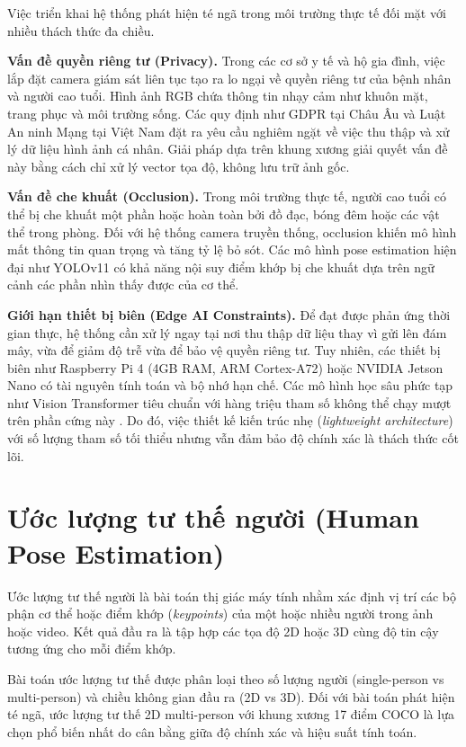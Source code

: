 Việc triển khai hệ thống phát hiện té ngã trong môi trường thực tế đối mặt với nhiều thách thức đa chiều.

\textbf{Vấn đề quyền riêng tư (Privacy).} Trong các cơ sở y tế và hộ gia đình, việc lắp đặt camera giám sát liên tục tạo ra lo ngại về quyền riêng tư của bệnh nhân và người cao tuổi. Hình ảnh RGB chứa thông tin nhạy cảm như khuôn mặt, trang phục và môi trường sống. Các quy định như GDPR tại Châu Âu và Luật An ninh Mạng tại Việt Nam đặt ra yêu cầu nghiêm ngặt về việc thu thập và xử lý dữ liệu hình ảnh cá nhân. Giải pháp dựa trên khung xương giải quyết vấn đề này bằng cách chỉ xử lý vector tọa độ, không lưu trữ ảnh gốc.

\textbf{Vấn đề che khuất (Occlusion).} Trong môi trường thực tế, người cao tuổi có thể bị che khuất một phần hoặc hoàn toàn bởi đồ đạc, bóng đêm hoặc các vật thể trong phòng. Đối với hệ thống camera truyền thống, occlusion khiến mô hình mất thông tin quan trọng và tăng tỷ lệ bỏ sót. Các mô hình pose estimation hiện đại như YOLOv11 có khả năng nội suy điểm khớp bị che khuất dựa trên ngữ cảnh các phần nhìn thấy được của cơ thể.

\textbf{Giới hạn thiết bị biên (Edge AI Constraints).} Để đạt được phản ứng thời gian thực, hệ thống cần xử lý ngay tại nơi thu thập dữ liệu thay vì gửi lên đám mây, vừa để giảm độ trễ vừa để bảo vệ quyền riêng tư. Tuy nhiên, các thiết bị biên như Raspberry Pi 4 (4GB RAM, ARM Cortex-A72) hoặc NVIDIA Jetson Nano có tài nguyên tính toán và bộ nhớ hạn chế. Các mô hình học sâu phức tạp như Vision Transformer tiêu chuẩn với hàng triệu tham số không thể chạy mượt trên phần cứng này \cite{kurniadi2026human}. Do đó, việc thiết kế kiến trúc nhẹ (\textit{lightweight architecture}) với số lượng tham số tối thiểu nhưng vẫn đảm bảo độ chính xác là thách thức cốt lõi.


\section{Ước lượng tư thế người (Human Pose Estimation)}
\label{sec:pose_estimation}

Ước lượng tư thế người là bài toán thị giác máy tính nhằm xác định vị trí các bộ phận cơ thể hoặc điểm khớp (\textit{keypoints}) của một hoặc nhiều người trong ảnh hoặc video. Kết quả đầu ra là tập hợp các tọa độ 2D hoặc 3D cùng độ tin cậy tương ứng cho mỗi điểm khớp.

Bài toán ước lượng tư thế được phân loại theo số lượng người (single-person vs multi-person) và chiều không gian đầu ra (2D vs 3D). Đối với bài toán phát hiện té ngã, ước lượng tư thế 2D multi-person với khung xương 17 điểm COCO là lựa chọn phổ biến nhất do cân bằng giữa độ chính xác và hiệu suất tính toán.

